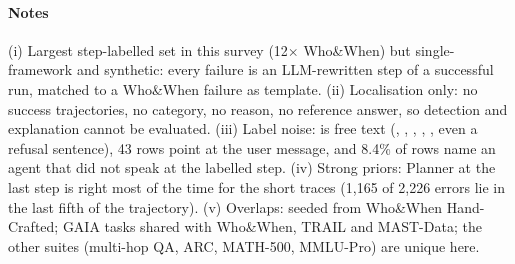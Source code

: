 \paragraph{Notes} (i) Largest step-labelled set in this survey (12$\times$ Who\&When) but single-framework and synthetic: every failure is an LLM-rewritten step of a successful run, matched to a Who\&When failure as template. (ii) Localisation only: no success trajectories, no category, no reason, no reference answer, so detection and explanation cannot be evaluated. (iii) Label noise:  is free text (\code{[Planner]}, , , , , even a refusal sentence), 43 rows point at the user message, and 8.4\% of rows name an agent that did not speak at the labelled step. (iv) Strong priors: Planner at the last step is right most of the time for the short traces (1,165 of 2,226 errors lie in the last fifth of the trajectory). (v) Overlaps: seeded from Who\&When Hand-Crafted; GAIA tasks shared with Who\&When, TRAIL and MAST-Data; the other suites (multi-hop QA, ARC, MATH-500, MMLU-Pro) are unique here.

